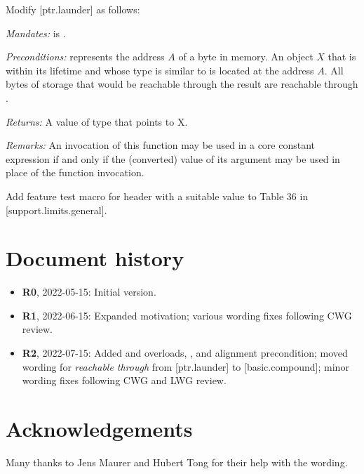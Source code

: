 Modify [ptr.launder] as follows:

\begin{adjustwidth}{0.5cm}{0.5cm}

  \emph{Mandates:}  is .

  \emph{Preconditions:}  represents the address $A$ of a byte in memory. An object $X$ that is within its lifetime and whose type is similar to  is located at the address $A$. All bytes of storage that would be reachable through  the result are reachable through  .

  \emph{Returns:} A value of type  that points to {X}.

  \emph{Remarks:} An invocation of this function may be used in a core constant expression if and only if the (converted) value of its argument may be used in place of the function invocation. 
\end{adjustwidth}

Add feature test macro
 for header  with a suitable value to
Table 36 in [support.limits.general].


\section*{Document history}

\begin{itemize}
\item \textbf{R0}, 2022-05-15: Initial version.
\item \textbf{R1}, 2022-06-15: Expanded motivation; various wording fixes following CWG review.
\item \textbf{R2}, 2022-07-15: Added  and  overloads, , and alignment precondition; moved wording for \emph{reachable through} from [ptr.launder] to [basic.compound]; minor wording fixes following CWG and LWG review.
\end{itemize}


\section*{Acknowledgements}

Many thanks to Jens Maurer and Hubert Tong for their help with the wording.


\renewcommand{\bibname}{References}



